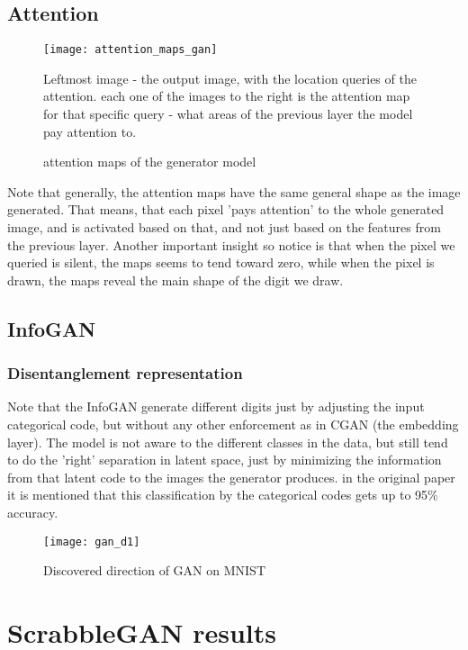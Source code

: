 \subsection{Attention}

\begin{figure}[h]
\centering
\texttt{[image: attention\_maps\_gan]}
\caption{attention maps of the generator model}
\label{fig:x cubed graph}
Leftmost image - the output image, with the location queries of the attention. each one of the images to the right is the attention map for that specific query - what areas of the previous layer the model pay attention to.
\end{figure}

Note that generally, the attention maps have the same general shape as the image generated. That means, that each pixel 'pays attention' to the whole generated image, and is activated based on that, and not just based on the features from the previous layer.
Another important insight so notice is that when the pixel we queried is silent, the maps seems to tend toward zero, while when the pixel is drawn, the maps reveal the main shape of the digit we draw.


\subsection{InfoGAN}


\subsubsection{Disentanglement representation}

Note that the InfoGAN generate different digits just by adjusting the input categorical code, but without any other enforcement as in CGAN (the embedding layer). The model is not aware to the different classes in the data, but still tend to do the 'right' separation in latent space, just by minimizing the information from that latent code to the images the generator produces. in the original paper it is mentioned that this classification by the categorical codes gets up to 95\% accuracy.


\begin{figure}[h]
\centering
\texttt{[image: gan\_d1]}
\caption{Discovered direction of GAN on MNIST}
\label{fig:x cubed graph}
\end{figure}




\section{ScrabbleGAN results}





